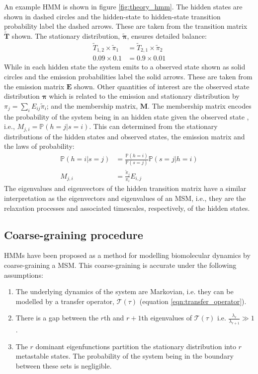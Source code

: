 An example HMM is shown in figure \ref{fig:theory_hmm}. The hidden states are shown in dashed circles and the hidden-state to hidden-state transition probability label the dashed arrows. These are taken from the transition matrix $\widetilde{\mathbf{T}}$ shown. The stationary distribution, $\widetilde{\bm{\pi}}$, ensures detailed balance:
\begin{align*}
    \widetilde{T}_{1,2}\times \widetilde{\pi}_{1} & = \widetilde{T}_{2,1}\times \widetilde{\pi}_{2}\\
    0.09\times 0.1 & = 0.9 \times 0.01
\end{align*}
While in each hidden state the system emits to a observed state shown as solid circles and the emission probabilities label the solid arrows. These are taken from the  emission matrix $\mathbf{E}$ shown. Other quantities of interest are the observed state distribution $\bm{\pi}$ which is related to the emission and  stationary distribution by $\pi_{j} = \sum_{i}E_{ij}\widetilde{\pi}_{i}$;  and the membership matrix, $\mathbf{M}$. The membership matrix encodes the probability of the system being in an hidden state given the observed state \cite{noeProjectedHiddenMarkov2013a}, i.e., $M_{j,i}=\mathbb{P}(h=j|s=i)$. This can determined from the stationary distributions of the hidden states and observed states, the emission matrix and the laws of probability:
\begin{align}
    \mathbb{P}(h=i|s=j) &= \frac{\mathbb{P}(h=i)}{\mathbb{P}(s=j)}\mathbb{P}(s=j|h=i) \\
    M_{j,i} &= \frac{\widetilde{\pi}_j}{\pi_i}E_{i,j}
\end{align}
The eigenvalues and eigenvectors of the hidden transition matrix have a similar interpretation as the eigenvectors and eigenvalues of an MSM, i.e., they are the relaxation processes and associated timescales, respectively, of the hidden states. 

\subsection{Coarse-graining procedure}
HMMs have been proposed as a method for modelling biomolecular dynamics by coarse-graining a MSM. \cite{noeProjectedHiddenMarkov2013a} This coarse-graining is accurate under the following assumptions: \cite{noeProjectedHiddenMarkov2013a}
\begin{enumerate}
    \item The underlying dynamics of the system are Markovian, i.e. they can be modelled by a transfer operator, $\mathcal{T}(\tau)$ (equation \ref{eqn:transfer_operator}). 
    \item There is a gap between the $r$th and $r+1$th  eigenvalues of $\mathcal{T}(\tau)$ i.e. $\frac{\lambda_{r}}{\lambda_{r+1}} \gg 1$.\label{assump_two}
    \item The $r$ dominant eigenfunctions partition the stationary distribution into $r$ metastable states. The probability of the system being in the boundary between these sets is negligible. \label{assump_three}
\end{enumerate}

